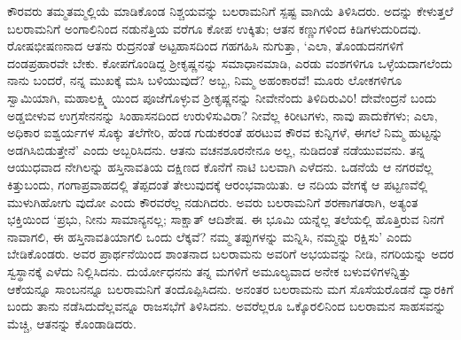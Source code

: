 ಕೌರವರು ತಮ್ಮತಮ್ಮಲ್ಲಿಯೆ ಮಾಡಿಕೊಂಡ ನಿಶ್ಚಯವನ್ನು ಬಲರಾಮನಿಗೆ ಸ್ಪಷ್ಟ ವಾಗಿಯೆ ತಿಳಿಸಿದರು. ಅದನ್ನು ಕೇಳುತ್ತಲೆ ಬಲರಾಮನಿಗೆ ಅಂಗಾಲಿನಿಂದ ನಡುನೆತ್ತಿಯ ವರೆಗೂ ಕೋಪ ಉಕ್ಕಿತು; ಆತನ ಕಣ್ಣುಗಳಿಂದ ಕಿಡಿಗಳುದುರಿದವು. ರೋಷಭೀಷಣನಾದ ಆತನು ರುದ್ರನಂತೆ ಅಟ್ಟಹಾಸದಿಂದ ಗಹಗಹಿಸಿ ನುಗುತ್ತಾ, ‘ಎಲಾ, ತೊಂಡುದನಗಳಿಗೆ ದಂಡಪ್ರಹಾರವೇ ಬೇಕು. ಕೋಪಗೊಂಡಿದ್ದ ಶ್ರೀಕೃಷ್ಣನನ್ನು ಸಮಾಧಾನಮಾಡಿ, ಎರಡು ವಂಶಗಳಿಗೂ ಒಳ್ಳೆಯದಾಗಲೆಂದು ನಾನು ಬಂದರೆ, ನನ್ನ ಮುಖಕ್ಕೆ ಮಸಿ ಬಳಿಯುವುದೆ? ಅಬ್ಬ, ನಿಮ್ಮ ಅಹಂಕಾರವೆ! ಮೂರು ಲೋಕಗಳಿಗೂ ಸ್ವಾಮಿಯಾಗಿ, ಮಹಾಲಕ್ಷ್ಮಿ ಯಿಂದ ಪೂಜೆಗೊಳ್ಳುವ ಶ್ರೀಕೃಷ್ಣನನ್ನು ನೀವೇನೆಂದು ತಿಳಿದಿರುವಿರಿ! ದೇವೇಂದ್ರನೆ ಬಂದು ಅಡ್ಡಬೀಳುವ ಉಗ್ರಸೇನನನ್ನು ಸಿಂಹಾಸನದಿಂದ ಉರುಳಿಸುವಿರಾ? ನೀವೆಲ್ಲ ಕಿರೀಟಗಳು, ನಾವು ಪಾದುಕೆಗಳು; ಎಲಾ, ಅಧಿಕಾರ ಐಶ್ವರ್ಯಗಳ ಸೊಕ್ಕು ತಲೆಗೇರಿ, ಹೆಂಡ ಗುಡುಕರಂತೆ ಹರಟುವ ಕೌರವ ಕುನ್ನಿಗಳೆ, ಈಗಲೆ ನಿಮ್ಮ ಹುಟ್ಟನ್ನು ಅಡಗಿಸಿಬಿಡುತ್ತೇನೆ’ ಎಂದು ಅಬ್ಬರಿಸಿದನು. ಆತನು ವಚನಶೂರನೇನೂ ಅಲ್ಲ, ನುಡಿದಂತೆ ನಡೆಯುವವನು. ತನ್ನ ಆಯುಧವಾದ ನೇಗಿಲನ್ನು ಹಸ್ತಿನಾವತಿಯ ದಕ್ಷಿಣದ ಕೊನೆಗೆ ನಾಟಿ ಬಲವಾಗಿ ಎಳೆದನು. ಒಡನೆಯೆ ಆ ನಗರವೆಲ್ಲ ಕಿತ್ತುಬಂದು, ಗಂಗಾಪ್ರವಾಹದಲ್ಲಿ ತೆಪ್ಪದಂತೆ ತೇಲುವುದಕ್ಕೆ ಆರಂಭವಾಯಿತು. ಆ ನದಿಯ ವೇಗಕ್ಕೆ ಆ ಪಟ್ಟಣವೆಲ್ಲಿ ಮುಳುಗಿಹೋಗು ವುದೋ ಎಂದು ಕೌರವರೆಲ್ಲ ನಡುಗಿದರು. ಅವರು ಬಲರಾಮನಿಗೆ ಶರಣಾಗತರಾಗಿ, ಅತ್ಯಂತ ಭಕ್ತಿಯಿಂದ ‘ಪ್ರಭು, ನೀನು ಸಾಮಾನ್ಯನಲ್ಲ; ಸಾಕ್ಷಾತ್ ಆದಿಶೇಷ. ಈ ಭೂಮಿ ಯನ್ನೆಲ್ಲ ತಲೆಯಲ್ಲಿ ಹೊತ್ತಿರುವ ನಿನಗೆ ನಾವಾಗಲಿ, ಈ ಹಸ್ತಿನಾವತಿಯಾಗಲಿ ಒಂದು ಲೆಕ್ಕವೆ? ನಮ್ಮ ತಪ್ಪುಗಳನ್ನು ಮನ್ನಿಸಿ, ನಮ್ಮನ್ನು ರಕ್ಷಿಸು’ ಎಂದು ಬೇಡಿಕೊಂಡರು. ಅವರ ಪ್ರಾರ್ಥನೆಯಿಂದ ಶಾಂತನಾದ ಬಲರಾಮನು ಅವರಿಗೆ ಅಭಯವನ್ನು ನೀಡಿ, ನಗರಿಯನ್ನು ಅದರ ಸ್ವಸ್ಥಾನಕ್ಕೆ ಎಳೆದು ನಿಲ್ಲಿಸಿದನು. ದುರ್ಯೋಧನನು ತನ್ನ ಮಗಳಿಗೆ ಅಮೂಲ್ಯವಾದ ಅನೇಕ ಬಳುವಳಿಗಳನ್ನಿತ್ತು ಆಕೆಯನ್ನೂ ಸಾಂಬನನ್ನೂ ಬಲರಾಮನಿಗೆ ತಂದೊಪ್ಪಿಸಿದನು. ಅನಂತರ ಬಲರಾಮನು ಮಗ ಸೊಸೆಯರೊಡನೆ ದ್ವಾರಕಿಗೆ ಬಂದು ತಾನು ನಡೆಸಿದುದೆಲ್ಲವನ್ನೂ ರಾಜಸಭೆಗೆ ತಿಳಿಸಿದನು. ಅವರೆಲ್ಲರೂ ಒಕ್ಕೊರಲಿನಿಂದ ಬಲರಾಮನ ಸಾಹಸವನ್ನು ಮೆಚ್ಚಿ, ಆತನನ್ನು ಕೊಂಡಾಡಿದರು.

